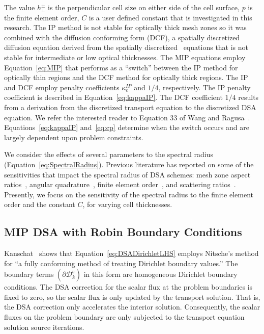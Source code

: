 \documentclass[12pt]{article}
\begin{document}
\noindent The value $h_\perp^\pm$ is the perpendicular cell size on either side of the cell surface, $p$ is the finite element order, $C$ is a user defined constant that is investigated in this research. The IP method is not stable for optically thick mesh zones so it was combined with the diffusion conforming form (DCF), a spatially discretized diffusion equation derived from the spatially discretized \SN\ equations that is not stable for intermediate or low optical thicknesses. The MIP equations employ Equation~\ref{eq:MIP} that performs as a ``switch'' between the IP method for optically thin regions and the DCF method for optically thick regions. The IP and DCF employ penalty coefficients $\kappa_e^{IP}$ and $1/4$, respectively. The IP penalty coefficient is described in Equation~\ref{eq:kappaIP}. The DCF coefficient $1/4$ results from a derivation from the discretized transport equation to the discretized DSA equation. We refer the interested reader to Equation 33 of Wang and Ragusa~\cite{WangRagusaDSA}. Equations~\ref{eq:kappaIP} and~\ref{eq:cp} determine when the switch occurs and are largely dependent upon problem constraints.

We consider the effects of several parameters to the spectral radius (Equation~\ref{eq:SpectralRadius}). Previous literature has reported on some of the sensitivities that impact the spectral radius of DSA schemes: mesh zone aspect ratios~\cite{AdamsDSADFEM,TurcksinDiscontinuousDSA}, angular quadrature~\cite{AdamsDSADFEM,TurcksinDiscontinuousDSA}, finite element order~\cite{WoodsDSA,WangRagusaDSA}, and scattering ratios~\cite{WoodsDSA,WangRagusaDSA,WareingDSADFEM}. Presently, we focus on the sensitivity of the spectral radius to the finite element order and the constant $C$, for varying cell thicknesses.

\subsection{MIP DSA with Robin Boundary Conditions}
\label{sec:MIPDSARobinBCs}
Kanschat~\cite{KanschatDGViscousIncompressFlow} shows that Equation~\ref{eq:DSADirichletLHS} employs Nitsche's method for ``a fully conforming method of treating Dirichlet boundary values.'' The boundary terms $\left(\partial \mathcal{D}_k^b \right)$ in this form are homogeneous Dirichlet boundary conditions. The DSA correction for the scalar flux at the problem boundaries is fixed to zero, so the scalar flux is only updated by the transport solution. That is, the DSA correction only accelerates the interior solution. Consequently, the scalar fluxes on the problem boundary are only subjected to the transport equation solution source iterations.
\end{document}
